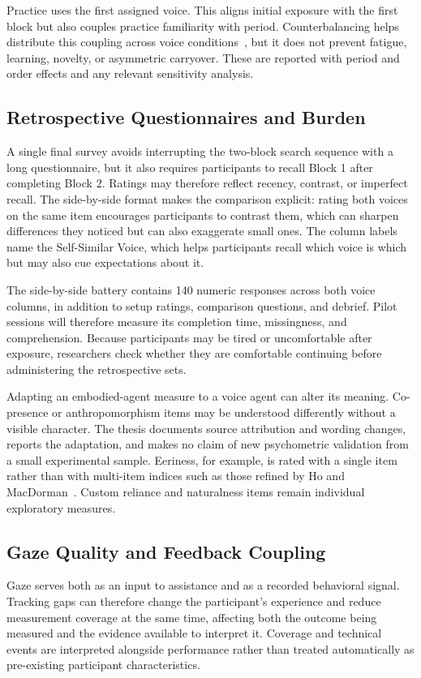 Practice uses the first assigned voice. This aligns initial exposure with the first block but also couples practice familiarity with period. Counterbalancing helps distribute this coupling across voice conditions~\cite{williams1949residual}, but it does not prevent fatigue, learning, novelty, or asymmetric carryover. These are reported with period and order effects and any relevant sensitivity analysis.

\subsection{Retrospective Questionnaires and Burden}
A single final survey avoids interrupting the two-block search sequence with a long questionnaire, but it also requires participants to recall Block 1 after completing Block 2. Ratings may therefore reflect recency, contrast, or imperfect recall. The side-by-side format makes the comparison explicit: rating both voices on the same item encourages participants to contrast them, which can sharpen differences they noticed but can also exaggerate small ones. The column labels name the Self-Similar Voice, which helps participants recall which voice is which but may also cue expectations about it.

The side-by-side battery contains 140 numeric responses across both voice columns, in addition to setup ratings, comparison questions, and debrief. Pilot sessions will therefore measure its completion time, missingness, and comprehension. Because participants may be tired or uncomfortable after exposure, researchers check whether they are comfortable continuing before administering the retrospective sets.

Adapting an embodied-agent measure to a voice agent can alter its meaning. Co-presence or anthropomorphism items may be understood differently without a visible character. The thesis documents source attribution and wording changes, reports the adaptation, and makes no claim of new psychometric validation from a small experimental sample. Eeriness, for example, is rated with a single item rather than with multi-item indices such as those refined by Ho and MacDorman~\cite{homacdorman2017eeriness}. Custom reliance and naturalness items remain individual exploratory measures.

\subsection{Gaze Quality and Feedback Coupling}
Gaze serves both as an input to assistance and as a recorded behavioral signal. Tracking gaps can therefore change the participant's experience and reduce measurement coverage at the same time, affecting both the outcome being measured and the evidence available to interpret it. Coverage and technical events are interpreted alongside performance rather than treated automatically as pre-existing participant characteristics.

